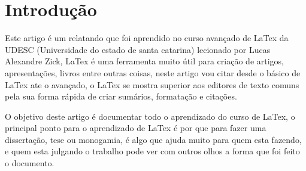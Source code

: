 \chapter{Introdução}

Este artigo é um relatando que foi aprendido no curso avançado de LaTex da UDESC (Universidade do estado de santa catarina) lecionado por Lucas Alexandre Zick, LaTex é uma ferramenta muito útil para criação de artigos, apresentações, livros entre outras coisas, neste artigo vou citar desde o básico de LaTex ate o avançado, o LaTex se mostra superior aos editores de texto comuns pela sua forma rápida de criar sumários, formatação e citações.


O objetivo deste artigo é documentar todo o aprendizado do curso de LaTex, o principal ponto para o aprendizado de LaTex é por que para fazer uma dissertação, tese ou monogamia, é algo que ajuda muito para quem esta fazendo, e quem esta julgando o trabalho pode ver com outros olhos a forma que foi feito o documento.